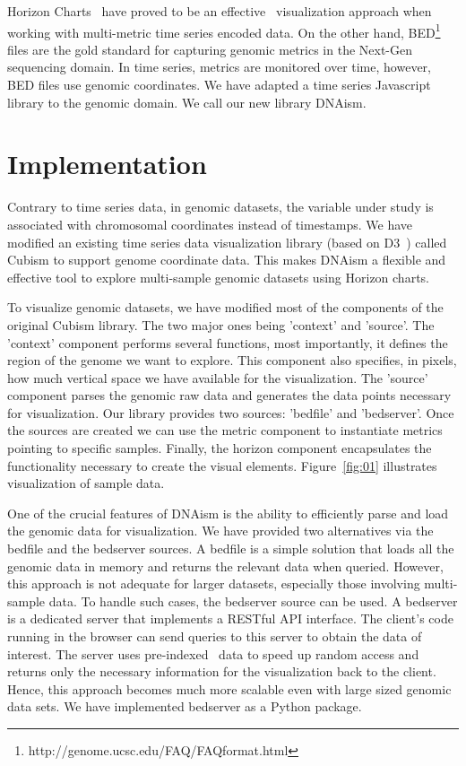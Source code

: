 \documentclass{bmcart}
\begin{document}
Horizon Charts~\cite{time-in-the-horizon} have proved to be an effective~\cite{2009-horizon}
visualization approach when working with multi-metric time series encoded data.
On the other hand, BED\footnote{http://genome.ucsc.edu/FAQ/FAQformat.html}
files are the gold standard for capturing genomic metrics in the Next-Gen
sequencing domain. In time series, metrics are monitored over time, however,
BED files use genomic coordinates. We have adapted a time series Javascript
library to the genomic domain. We call our new library DNAism.



\section*{Implementation}

Contrary to time series data, in genomic datasets, the variable under study is
associated with chromosomal coordinates instead of timestamps. We have modified
an existing time series data visualization library (based on D3~\cite{2011-d3})
called Cubism to support genome coordinate data. This makes DNAism
a flexible and effective tool to explore multi-sample genomic datasets using
Horizon charts.

To visualize genomic datasets, we have modified most of the components of the
original Cubism library.  The two major ones being 'context' and
'source'.  The 'context' component performs several functions, most
importantly, it defines the region of the genome we want to explore. This
component also specifies, in pixels, how much vertical space we have available
for the visualization.  The 'source' component parses the genomic raw data and
generates the data points necessary for visualization. Our library provides two
sources: 'bedfile' and 'bedserver'. Once the sources are created we can use the
metric component to instantiate metrics pointing to specific samples.  Finally,
the horizon component encapsulates the functionality necessary to create the
visual elements. Figure~\ref{fig:01} illustrates visualization of sample data.

One of the crucial features of DNAism is the ability to efficiently parse and
load the genomic data for visualization. We have provided two alternatives via
the bedfile and the bedserver sources. A bedfile is a simple solution that
loads all the genomic data in memory and returns the relevant data when
queried.  However, this approach is not adequate for larger datasets,
especially those involving multi-sample data. To handle such cases, the
bedserver source can be used. A bedserver is a dedicated server that
implements a RESTful API interface. The client's code running in the browser
can send queries to this server to obtain the data of interest.  The server
uses pre-indexed~\cite{tabix-li} data to speed up random access and returns
only the necessary information for the visualization back to the client.
Hence, this approach becomes much more scalable even with large sized genomic
data sets. We have implemented bedserver as a Python package.
\end{document}
